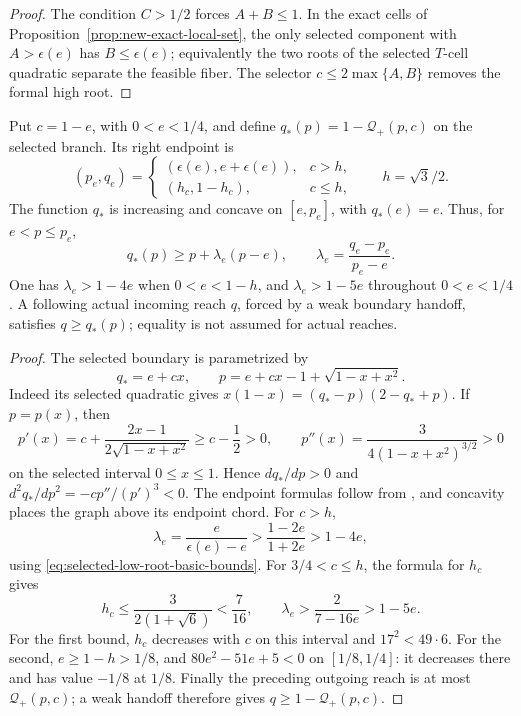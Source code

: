 \begin{proof}
The condition $C>1/2$ forces $A+B\le1$.  In the exact cells of
Proposition~\ref{prop:new-exact-local-set}, the only selected component with
$A>\epsilon(e)$ has $B\le\epsilon(e)$; equivalently the two roots of the
selected $T$-cell quadratic separate the feasible fiber.  The selector
$c\le2\max\{A,B\}$ removes the formal high root.
\end{proof}

\begin{lemma}
\label{lem:new-selected-chords}
Put $c=1-e$, with $0<e<1/4$, and define
$q_*(p)=1-\mathcal Q_+(p,c)$ on the selected branch. Its right endpoint is
\[
 (p_e,q_e)=
 \begin{cases}
 (\epsilon(e),e+\epsilon(e)),&c>h,\\
 (h_c,1-h_c),&c\le h,
 \end{cases}
 \qquad h=\sqrt3/2.
\]
The function $q_*$ is increasing and concave on $[e,p_e]$, with
$q_*(e)=e$. Thus, for $e<p\le p_e$,
\[
 q_*(p)\ge p+\lambda_e(p-e),\qquad
 \lambda_e=\frac{q_e-p_e}{p_e-e}.
\]
One has $\lambda_e>1-4e$ when $0<e<1-h$, and
$\lambda_e>1-5e$ throughout $0<e<1/4$.
A following actual incoming reach $q$, forced by a weak boundary handoff,
satisfies $q\ge q_*(p)$; equality is not assumed for actual reaches.
\end{lemma}
\begin{proof}
The selected boundary is parametrized by
\[
 q_*=e+cx,\qquad p=e+cx-1+\sqrt{1-x+x^2}.
\]
Indeed its selected quadratic gives
$x(1-x)=(q_*-p)(2-q_*+p)$. If $p=p(x)$, then
\[
 p'(x)=c+\frac{2x-1}{2\sqrt{1-x+x^2}}\ge c-\frac12>0,
 \qquad p''(x)=\frac3{4(1-x+x^2)^{3/2}}>0
\]
on the selected interval $0\le x\le1$.
Hence $dq_*/dp>0$ and $d^2q_*/dp^2=-cp''/(p')^3<0$.
The endpoint formulas follow from ,
and concavity places the graph above its endpoint chord.
For $c>h$,
\[
 \lambda_e=\frac e{\epsilon(e)-e}
 >\frac{1-2e}{1+2e}>1-4e,
\]
using \eqref{eq:selected-low-root-basic-bounds}.
For $3/4<c\le h$, the formula for $h_c$ gives
\[
 h_c\le\frac3{2(1+\sqrt6)}<\frac7{16},\qquad
 \lambda_e>\frac2{7-16e}>1-5e.
\]
For the first bound, $h_c$ decreases with $c$ on this interval and
$17^2<49\cdot6$. For the second, $e\ge1-h>1/8$, and
$80e^2-51e+5<0$ on $[1/8,1/4]$: it decreases there and has value
$-1/8$ at $1/8$.
Finally the preceding outgoing reach is at most $\mathcal Q_+(p,c)$;
a weak handoff therefore gives $q\ge1-\mathcal Q_+(p,c)$.
\end{proof}

